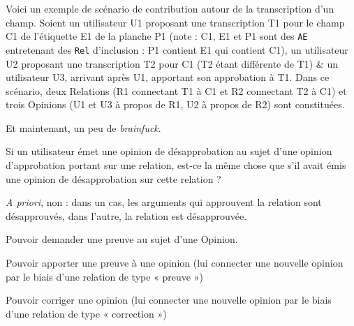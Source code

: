 Voici un exemple de scénario de contribution autour de la transcription d'un champ.
Soient un utilisateur U1 proposant une transcription T1 pour le champ C1 de l'étiquette E1 de la planche P1 (note : C1, E1 et P1 sont des {\tt AE} entretenant des {\tt Rel} d'inclusion : P1 contient E1 qui contient C1), un utilisateur U2 proposant une transcription T2 pour C1 (T2 étant différente de T1) & un utilisateur U3, arrivant après U1, apportant son approbation à T1.
Dans ce scénario, deux Relations (R1 connectant T1 à C1 et R2 connectant T2 à C1) et trois Opinions (U1 et U3 à propos de R1, U2 à propos de R2) sont constituées.

\bigskip

Et maintenant, un peu de {\it brainfuck}.

Si un utilisateur émet une opinion de désapprobation au sujet d'une opinion d'approbation portant sur une relation, est-ce la même chose que s'il avait émis une opinion de désapprobation sur cette relation ?

{\it A priori}, non : dans un cas, les arguments qui approuvent la relation sont désapprouvés, dans l'autre, la relation est désapprouvée.

\startTODO
\startitemize
	\item Pouvoir demander une preuve au sujet d'une Opinion.
	\item Pouvoir apporter une preuve à une opinion (lui connecter une nouvelle opinion par le biais d'une relation de type « preuve »)
	\item Pouvoir corriger une opinion (lui connecter une nouvelle opinion par le biais d'une relation de type « correction »)
\stopitemize
\stopTODO